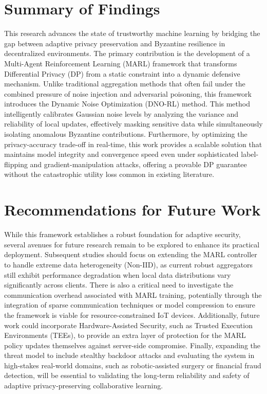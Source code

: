 \section{Summary of Findings}
This research advances the state of trustworthy machine learning by bridging the gap between adaptive privacy preservation and Byzantine resilience in decentralized environments. The primary contribution is the development of a Multi-Agent Reinforcement Learning (MARL) framework that transforms Differential Privacy (DP) from a static constraint into a dynamic defensive mechanism. Unlike traditional aggregation methods that often fail under the combined pressure of noise injection and adversarial poisoning, this framework introduces the Dynamic Noise Optimization (DNO-RL) method. This method intelligently calibrates Gaussian noise levels by analyzing the variance and reliability of local updates, effectively masking sensitive data while simultaneously isolating anomalous Byzantine contributions. Furthermore, by optimizing the privacy-accuracy trade-off in real-time, this work provides a scalable solution that maintains model integrity and convergence speed even under sophisticated label-flipping and gradient-manipulation attacks, offering a provable DP guarantee without the catastrophic utility loss common in existing literature.

\section{Recommendations for Future Work}
While this framework establishes a robust foundation for adaptive security, several avenues for future research remain to be explored to enhance its practical deployment. Subsequent studies should focus on extending the MARL controller to handle extreme data heterogeneity (Non-IID), as current robust aggregators still exhibit performance degradation when local data distributions vary significantly across clients. There is also a critical need to investigate the communication overhead associated with MARL training, potentially through the integration of sparse communication techniques or model compression to ensure the framework is viable for resource-constrained IoT devices. Additionally, future work could incorporate Hardware-Assisted Security, such as Trusted Execution Environments (TEEs), to provide an extra layer of protection for the MARL policy updates themselves against server-side compromise. Finally, expanding the threat model to include stealthy backdoor attacks and evaluating the system in high-stakes real-world domains, such as robotic-assisted surgery or financial fraud detection, will be essential to validating the long-term reliability and safety of adaptive privacy-preserving collaborative learning.
